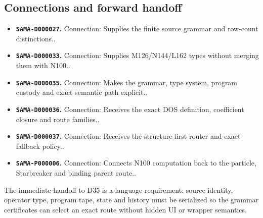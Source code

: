 \subsection{Connections and forward
handoff}\label{viii-ch01-connections-and-forward-handoff}

\begin{itemize}
\tightlist
\item
  \textbf{\texttt{SAMA-D000027}.} Connection: Supplies the finite source
  grammar and row-count distinctions..
\item
  \textbf{\texttt{SAMA-D000033}.} Connection: Supplies M126/N144/L162
  types without merging them with N100..
\item
  \textbf{\texttt{SAMA-D000035}.} Connection: Makes the grammar, type
  system, program custody and exact semantic path explicit..
\item
  \textbf{\texttt{SAMA-D000036}.} Connection: Receives the exact DOS
  definition, coefficient closure and route families..
\item
  \textbf{\texttt{SAMA-D000037}.} Connection: Receives the
  structure-first router and exact fallback policy..
\item
  \textbf{\texttt{SAMA-P000006}.} Connection: Connects N100 computation
  back to the particle, Starbreaker and binding parent route..
\end{itemize}

The immediate handoff to D35 is a language requirement: source identity,
operator type, program tape, state and history must be serialized so the
grammar certificates can select an exact route without hidden UI or
wrapper semantics.


\label{viii-ch01-established-result-and-current-boundaries}
\label{viii-ch01-overview-1}
\label{viii-ch01-opening-question-and-conceptual-picture-1}
\label{viii-ch01-the-complete-h14f-n100-result}
\label{viii-ch01-source-object}
\label{viii-ch01-retained-role-closure}
\label{viii-ch01-execution-receipt}
\label{viii-ch01-deriving-the-n100-structure-first-work}
\label{viii-ch01-component-census}
\label{viii-ch01-why-165920-does-not-replace-2100}
\label{viii-ch01-same-output-equality}
\label{viii-ch01-grammar-to-work-identities}
\label{viii-ch01-source-native-controls-and-deviations-1}
\label{viii-ch01-n105-restoration-control}
\label{viii-ch01-n81-octahedral-control-1}
\label{viii-ch01-n72-dense-contrast-1}
